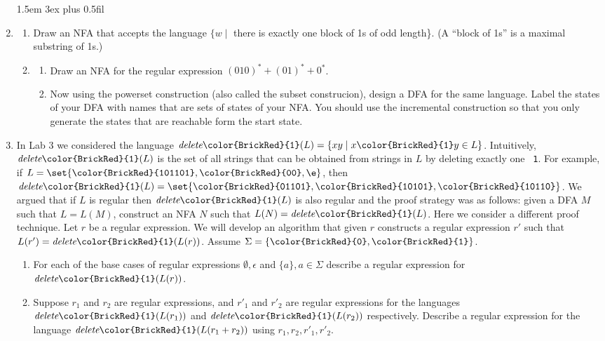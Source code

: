 \documentclass[11pt]{article}
\def\Sym#1{\texttt{\upshape \color{BrickRed} {#1}}}
\begin{document}
\begin{enumerate}
\parindent 1.5em \itemsep 3ex plus 0.5fil


\item \begin{enumerate}
\item Draw an NFA that accepts the language $\{w \mid$ there is exactly one  block of 1s of odd length\}.  (A ``block of 1s'' is a maximal substring of 1s.)
\item
\begin{enumerate}
\item Draw an NFA for the regular expression $(010)^* + (01)^* + 0^*$.
\item Now using the powerset construction (also called the subset
  construcion), design a DFA for the same language.  Label the states
  of your DFA with names that are sets of states of your NFA. You
  should use the incremental construction so that you only generate
  the states that are reachable form the start state.
\end{enumerate}
\end{enumerate}

\item In Lab 3 we considered the language
  $\emph{delete}\Sym1(L) = \{xy \mid x\Sym1y \in L\}$.  Intuitively,
  $\emph{delete}\Sym1(L)$ is the set of all strings that can be
  obtained from strings in $L$ by deleting exactly one \Sym1.  For
  example, if $L = \set{\Sym{101101}, \Sym{00}, \e}$, then
  $\emph{delete}\Sym1(L) = \set{\Sym{01101}, \Sym{10101},
    \Sym{10110}}$.  We argued that if $L$ is regular then
  $\emph{delete}\Sym1(L)$ is also regular and the proof strategy was
  as follows: given a DFA $M$ such that $L=L(M)$, construct an NFA
  $N$ such that $L(N) = \emph{delete}\Sym1(L)$. Here we consider a
  different proof technique.  Let $r$ be a regular expression. We
  will develop an algorithm that given $r$ constructs a regular expression 
  $r'$ such that $L(r') = \emph{delete}\Sym1(L(r))$. Assume
  $\Sigma = \{\Sym0,\Sym1\}$.
    \begin{enumerate}
    \item For each of the base cases of regular expressions
      $\emptyset, \epsilon$ and $\{a\}, a \in \Sigma$ describe
      a regular expression for $\emph{delete}\Sym1(L(r))$.
    \item Suppose $r_1$ and $r_2$ are regular expressions, and
      $r'_1$ and $r'_2$ are regular expressions for the languages
      $\emph{delete}\Sym1(L(r_1))$ and $\emph{delete}\Sym1(L(r_2))$
      respectively. Describe a regular expression for the language
      $\emph{delete}\Sym1(L(r_1+r_2))$ using $r_1,r_2,r'_1,r'_2$.



\end{enumerate}
\end{enumerate}
\end{document}
